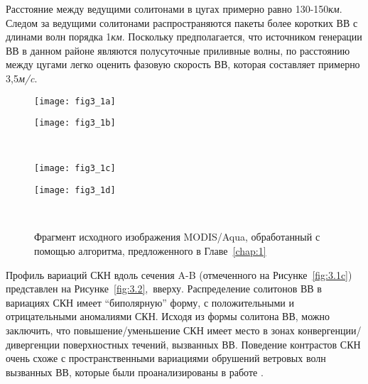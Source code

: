 Расстояние между ведущими солитонами в цугах примерно равно 130-150\textit{км}. Следом за ведущими солитонами распространяются пакеты более коротких ВВ с длинами волн порядка 1\textit{км}. Поскольку предполагается, что источником генерации ВВ в данном районе являются полусуточные приливные волны, по расстоянию между цугами легко оценить фазовую скорость ВВ, которая составляет примерно 3,5\textit{м/c}.



\begin{figure}[H]
   	\centering
	\begin{minipage}{.47\textwidth}
	    \subcaptionbox{\label{fig:3.1a}}
		{\texttt{[image: fig3\_1a]}}
	\end{minipage}
	\hfill
	\begin{minipage}{.47\textwidth}
	    \subcaptionbox{\label{fig:3.1b}}
		{\texttt{[image: fig3\_1b]}}
	\end{minipage}
	\\
	\begin{minipage}{.47\textwidth}
	    \subcaptionbox{\label{fig:3.1c}}
		{\texttt{[image: fig3\_1c]}}
	\end{minipage}
	\hfill
	\begin{minipage}{.47\textwidth}
	    \subcaptionbox{\label{fig:3.1d}}
		{\texttt{[image: fig3\_1d]}}
	\end{minipage}
    \\
    \caption{Фрагмент исходного изображения MODIS/Aqua, обработанный с помощью алгоритма, предложенного в Главе~\ref{chap:1}}
    \label{fig:3.1}
\end{figure}


Профиль вариаций СКН вдоль сечения A-B (отмеченного на Рисунке~\ref{fig:3.1c}) представлен на Рисунке~\ref{fig:3.2},~вверху. Распределение солитонов ВВ в вариациях СКН имеет ``биполярную'' форму, с положительными и отрицательными аномалиями СКН. Исходя из формы солитона ВВ, можно заключить, что повышение/уменьшение СКН имеет место в зонах конвергенции/дивергенции поверхностных течений, вызванных ВВ. Поведение контрастов СКН очень схоже с пространственными вариациями обрушений ветровых волн вызванных ВВ, которые были проанализированы в работе \citep{1986}.



